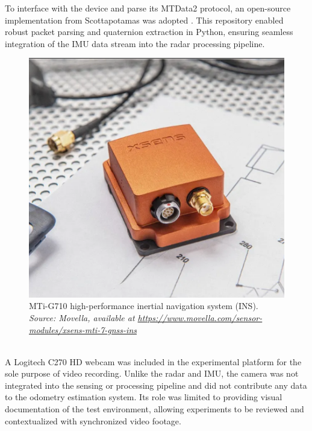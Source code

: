 To interface with the device and parse its MTData2 protocol, an open-source implementation from Scottapotamas was adopted \cite{xsens_repo}.  
This repository enabled robust packet parsing and quaternion extraction in Python, ensuring seamless integration of the IMU data stream into the radar processing pipeline.  

\begin{figure}[!htbp]
    \centering
    \includegraphics[width=0.65\linewidth]{images/mti_g710.png}
    \caption{MTi-G710 high-performance inertial navigation system (INS).\\
    \textit{Source: Movella, available at \url{https://www.movella.com/sensor-modules/xsens-mti-7-gnss-ins}}}
    \label{fig:MTi-G710 sensor}
\end{figure}

\hfill
\\
\indent A Logitech C270 HD webcam was included in the experimental platform for the sole purpose of video recording.  
Unlike the radar and IMU, the camera was not integrated into the sensing or processing pipeline and did not contribute any data to the odometry estimation system.  
Its role was limited to providing visual documentation of the test environment, allowing experiments to be reviewed and contextualized with synchronized video footage.  
